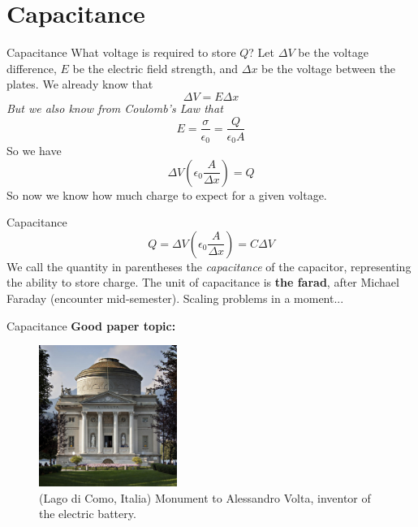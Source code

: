 \documentclass{beamer}
\begin{document}
\section{Capacitance}

\begin{frame}{Capacitance}
What voltage is required to store $Q$? Let $\Delta V$ be the voltage difference, $E$ be the electric field strength, and $\Delta x$ be the voltage between the plates.  We already know that
\begin{equation}
\Delta V = E\Delta x
\end{equation}
\textit{But we also know from Coulomb's Law that}
\begin{equation}
E = \frac{\sigma}{\epsilon_0} = \frac{Q}{\epsilon_0 A}
\end{equation}
So we have
\begin{equation}
\Delta V \left(\epsilon_0 \frac{A}{\Delta x}\right) = Q
\end{equation}
So now we know how much charge to expect for a given voltage.
\end{frame}

\begin{frame}{Capacitance}
\begin{equation}
\boxed{
Q = \Delta V \left(\epsilon_0 \frac{A}{\Delta x}\right) = C\Delta V}
\end{equation}
We call the quantity in parentheses the \textit{capacitance} of the capacitor, representing the ability to store charge.  The unit of capacitance is \textbf{the farad}, after Michael Faraday (encounter mid-semester).  Scaling problems in a moment...
\end{frame}

\begin{frame}{Capacitance}
\textbf{Good paper topic:}
\begin{figure}
\centering
\includegraphics[width=0.4\textwidth]{figures/volta.jpg}
\caption{\label{fig:volta2} \small (Lago di Como, Italia) Monument to Alessandro Volta, inventor of the electric battery.}
\end{figure}
\end{frame}
\end{document}
